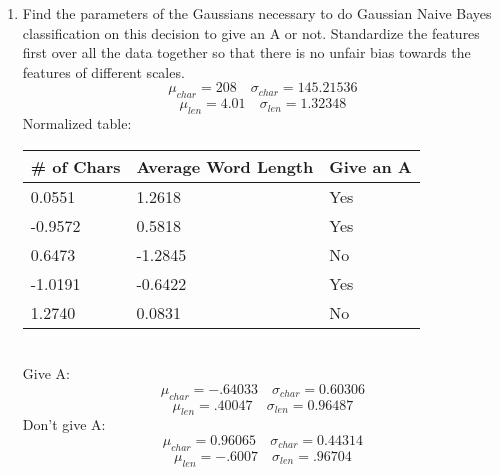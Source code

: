 \documentclass[12pt]{article}
\begin{document}
\begin{enumerate}
\begin{enumerate}
	\item Find the parameters of the Gaussians necessary to do Gaussian Naive Bayes classification on this decision to give an A or not.  Standardize the features first over all the data together so that there is no unfair bias towards the features of different scales.\\

    $$\mu_{char} = 208 \quad \sigma_{char} = 145.21536$$
    $$\mu_{len} = 4.01 \quad \sigma_{len} = 1.32348$$
    Normalized table:
\begin{table}[h]
\begin{center}
\begin{tabular}{|l|l|l|}
\hline
\# of Chars & Average Word Length & Give an A\\
\hline
\phantom{-}0.0551 & \phantom{-}1.2618 & Yes\\
-0.9572 & \phantom{-}0.5818 & Yes\\
\phantom{-}0.6473 & -1.2845 & No \\
-1.0191 & -0.6422 & Yes \\
\phantom{-}1.2740 &  \phantom{-}0.0831 & No\\
\hline
\end{tabular}
\end{center}
\end{table}\\
    Give A:
    $$\mu_{char} = -.64033 \quad \sigma_{char} = 0.60306$$
    $$\mu_{len} = .40047 \quad \sigma_{len} = 0.96487$$
    Don't give A:
    $$\mu_{char} = 0.96065 \quad \sigma_{char} = 0.44314$$
    $$\mu_{len} = -.6007 \quad \sigma_{len} = .96704$$


\end{enumerate}
\end{enumerate}
\end{document}
